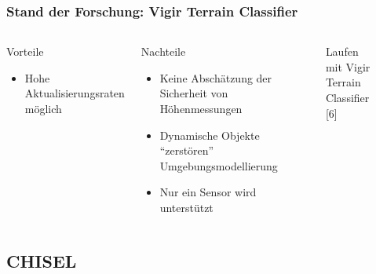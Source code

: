 \begin{frame}[t]
  \frametitle{Stand der Forschung: Vigir Terrain Classifier}
      
     \begin{columns}[t]
      \column[]{6cm}
      
       \begin{exampleblock}{Vorteile}
	  \begin{itemize}
	    \item Hohe Aktualisierungsraten möglich
	  \end{itemize} 
	\end{exampleblock}
	  
	\begin{alertblock}{Nachteile}
	  \begin{itemize}
		\item Keine Abschätzung der Sicherheit von Höhenmessungen
		\item Dynamische Objekte "`zerstören"' Umgebungsmodellierung
		\item Nur ein Sensor wird unterstützt
	      \end{itemize} 
	    \end{alertblock}
	    
     \column{6cm}

       \begin{figure}[h]
       \vspace{-0.5cm}
 	\caption{Laufen mit Vigir Terrain Classifier [6]} 
       \end{figure}

  
    \end{columns}  
      
\end{frame}

 \subsection*{CHISEL}
 

